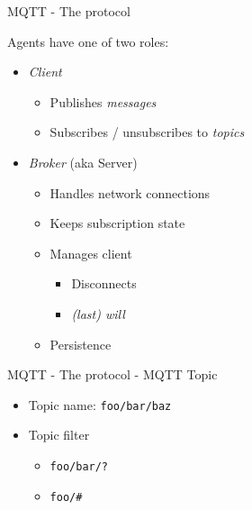\begin{frame}{MQTT - The protocol}
\protect\hypertarget{mqtt---the-protocol}{}

Agents have one of two roles:

\begin{itemize}
\tightlist
\item
  \emph{Client}

  \begin{itemize}
  \tightlist
  \item
    Publishes \emph{messages}
  \item
    Subscribes / unsubscribes to \emph{topics}
  \end{itemize}
\item
  \emph{Broker} (aka Server)

  \begin{itemize}
  \tightlist
  \item
    Handles network connections
  \item
    Keeps subscription state
  \item
    Manages client

    \begin{itemize}
    \tightlist
    \item
      Disconnects
    \item
      \emph{(last) will}
    \end{itemize}
  \item
    Persistence
  \end{itemize}
\end{itemize}


\end{frame}

\begin{frame}[fragile]{MQTT - The protocol - MQTT Topic}
\protect\hypertarget{mqtt---the-protocol---mqtt-topic}{}

\begin{itemize}
\tightlist
\item
  Topic name: \texttt{foo/bar/baz}
\item
  Topic filter

  \begin{itemize}
  \tightlist
  \item
    \texttt{foo/bar/?}
  \item
    \texttt{foo/\#}
  \end{itemize}
\end{itemize}

\end{frame}

